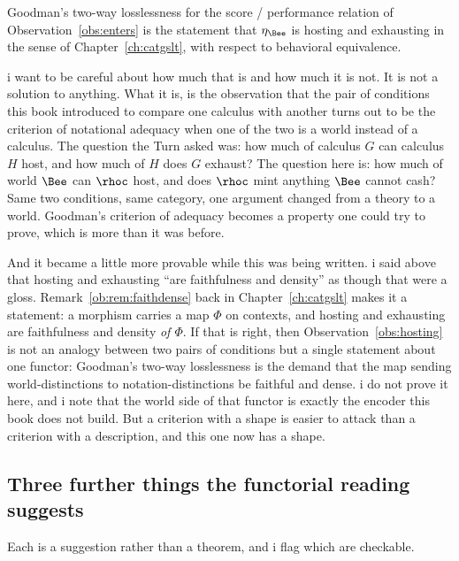 \begin{observation}
\label{obs:hosting}
Goodman's two-way losslessness for the score / performance relation
of Observation~\ref{obs:enters} is the statement that $\eta_{\Bee}$
is hosting and exhausting in the sense of
Chapter~\ref{ch:catgslt}, with respect to behavioral equivalence.
\end{observation}

\noindent
i want to be careful about how much that is and how much it is not.
It is not a solution to anything.
What it is, is the observation that the pair of conditions this
book introduced to compare one calculus with another turns out to
be the criterion of notational adequacy when one of the two is a
world instead of a calculus.
The question the Turn asked was: how much of calculus $G$ can
calculus $H$ host, and how much of $H$ does $G$ exhaust?
The question here is: how much of world $\Bee$ can $\rhoc$ host,
and does $\rhoc$ mint anything $\Bee$ cannot cash?
Same two conditions, same category, one argument changed from a
theory to a world.
Goodman's criterion of adequacy becomes a property one could try to
prove, which is more than it was before.

And it became a little more provable while this was being written.
i said above that hosting and exhausting ``are faithfulness and
density'' as though that were a gloss.
Remark~\ref{ob:rem:faithdense} back in Chapter~\ref{ch:catgslt} makes
it a statement: a morphism carries a map $\Phi$ on contexts, and
hosting and exhausting are faithfulness and density \emph{of $\Phi$}.
If that is right, then Observation~\ref{obs:hosting} is not an
analogy between two pairs of conditions but a single statement about
one functor: Goodman's two-way losslessness is the demand that the
map sending world-distinctions to notation-distinctions be faithful
and dense.
i do not prove it here, and i note that the world side of that
functor is exactly the encoder this book does not build.
But a criterion with a shape is easier to attack than a criterion
with a description, and this one now has a shape.

\subsection{Three further things the functorial reading suggests}
\label{sec:suggests}

Each is a suggestion rather than a theorem, and i flag which are
checkable.


